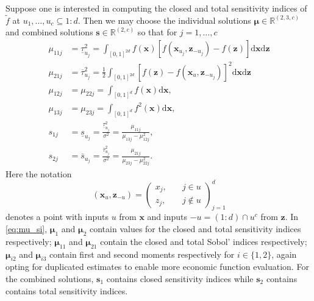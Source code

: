 \documentclass[graybox]{svmult}
\begin{document}
Suppose one is interested in computing the closed and total sensitivity indices of $\tilde{f}$ at $u_1,\dots,u_c \subseteq 1:d$.  Then we may choose the individual solutions $\boldsymbol{\mu} \in \mathbb{R}^{(2, 3, c)}$ and combined solutions $\boldsymbol{s} \in \mathbb{R}^{(2, c)}$ so that for $j=1,\dots,c$
\begin{equation}
\begin{aligned}
    \mu_{11j} &= \underline{\tau}_{u_j}^2 = \int_{[0,1]^{2d}} f(\boldsymbol{x})[f(\boldsymbol{x}_{u_j},\boldsymbol{z}_{-{u_j}})-f(\boldsymbol{z})]\mathrm{d}\boldsymbol{x}\mathrm{d}\boldsymbol{z} \\
    \mu_{21j} &= \overline{\tau}_{u_j}^2 = \frac{1}{2}\int_{[0,1]^{2d}} [f(\boldsymbol{z})-f(\boldsymbol{x}_u,\boldsymbol{z}_{-{u_j}})]^2\mathrm{d}\boldsymbol{x}\mathrm{d}\boldsymbol{z} \\
    \mu_{12j} &= \mu_{22j} = \int_{[0,1]^{d}} f(\boldsymbol{x})\mathrm{d}\boldsymbol{x}, \\
    \mu_{13j} &= \mu_{23j} = \int_{[0,1]^{d}} f^2(\boldsymbol{x})\mathrm{d}\boldsymbol{x}, \\
    s_{1j} &= \underline{s}_{u_j} = \frac{\underline{\tau}_{u_j}^2}{\sigma^2} = \frac{\mu_{11j}}{\mu_{13j}-\mu_{12j}^2}, \\
    s_{2j} &= \overline{s}_{u_j} = \frac{\overline{\tau}_{u_j}^2}{\sigma^2} = \frac{\mu_{21j}}{\mu_{23j}-\mu_{22j}^2}.  
\end{aligned}
\label{eq:mu_si}
\end{equation}
Here the notation
\begin{equation*}
    (\boldsymbol{x}_{u},\boldsymbol{z}_{-u}) = \left(\begin{aligned}x_{j}, \quad & j \in u \\ z_{j}, \quad & j \notin u \end{aligned}\right)_{j=1}^{d}
\end{equation*}
denotes a point with inputs $u$ from $\boldsymbol{x}$ and inputs $-u=(1:d)\cap u^c$ from $\boldsymbol{z}$. In \eqref{eq:mu_si}, $\boldsymbol{\mu}_1$ and $\boldsymbol{\mu}_2$ contain values for the closed and  total sensitivity indices respectively; $\boldsymbol{\mu}_{11}$ and $\boldsymbol{\mu}_{21}$ contain the closed and total Sobol' indices respectively; $\boldsymbol{\mu}_{i2}$ and $\boldsymbol{\mu}_{i3}$ contain first and second moments respectively for $i \in \{1,2\}$, again opting for duplicated estimates to enable more economic function evaluation. For the combined solutions, $\boldsymbol{s}_1$ contains closed sensitivity indices while $\boldsymbol{s}_2$ contains contains total sensitivity indices. 
\end{document}
